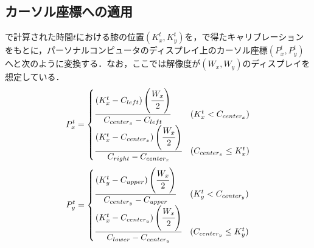 \subsection{カーソル座標への適用}
で計算された時間$t$における膝の位置$(K^t_x, K^t_y)$を，で得たキャリブレーションをもとに，パーソナルコンピュータのディスプレイ上のカーソル座標$(P^t_x, P^t_y)$へと次のように変換する．なお，ここでは解像度が$(W_x, W_y)$のディスプレイを想定している．
\begin{eqnarray}
	P^t_x = 
	\begin{cases}
		\cfrac{(K^t_x - C_{left}) \left( \cfrac{W_x}{2} \right)}{C_{center_x} - C_{left}} & (K^t_x < C_{center_x})\\
		\cfrac{(K^t_x - C_{center_x}) \left( \cfrac{W_x}{2} \right)}{C_{right} - C_{center_x}} & (C_{center_x} \leq K^t_x)
	\end{cases}	 
\end{eqnarray}
\begin{eqnarray}
	P^t_y = 
	\begin{cases}
		\cfrac{(K^t_y - C_{upper}) \left( \cfrac{W_x}{2} \right)}{C_{center_y} - C_{upper}} & (K^t_y < C_{center_y}) \\
		\cfrac{(K^t_x - C_{center_y}) \left( \cfrac{W_x}{2} \right)}{C_{lower} - C_{center_y}} & (C_{center_y} \leq K^t_y)
	\end{cases}
\end{eqnarray}





